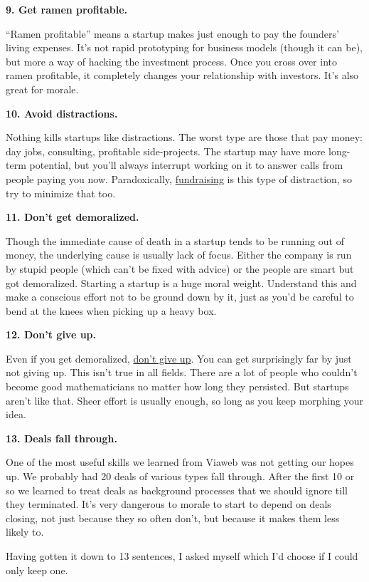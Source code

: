\documentclass[12pt]{book}
\begin{document}
\textbf{9. Get ramen profitable.}

``Ramen profitable'' means a startup makes just enough to pay the
founders' living expenses. It's not rapid prototyping for business
models (though it can be), but more a way of hacking the investment
process. Once you cross over into ramen profitable, it completely
changes your relationship with investors. It's also great for morale.

\textbf{10. Avoid distractions.}

Nothing kills startups like distractions. The worst type are those that
pay money: day jobs, consulting, profitable side-projects. The startup
may have more long-term potential, but you'll always interrupt working
on it to answer calls from people paying you now. Paradoxically,
\href{fundraising.html}{fundraising} is this type of distraction, so try
to minimize that too.

\textbf{11. Don't get demoralized.}

Though the immediate cause of death in a startup tends to be running out
of money, the underlying cause is usually lack of focus. Either the
company is run by stupid people (which can't be fixed with advice) or
the people are smart but got demoralized. Starting a startup is a huge
moral weight. Understand this and make a conscious effort not to be
ground down by it, just as you'd be careful to bend at the knees when
picking up a heavy box.

\textbf{12. Don't give up.}

Even if you get demoralized, \href{die.html}{don't give up}. You can get
surprisingly far by just not giving up. This isn't true in all fields.
There are a lot of people who couldn't become good mathematicians no
matter how long they persisted. But startups aren't like that. Sheer
effort is usually enough, so long as you keep morphing your idea.

\textbf{13. Deals fall through.}

One of the most useful skills we learned from Viaweb was not getting our
hopes up. We probably had 20 deals of various types fall through. After
the first 10 or so we learned to treat deals as background processes
that we should ignore till they terminated. It's very dangerous to
morale to start to depend on deals closing, not just because they so
often don't, but because it makes them less likely to.

Having gotten it down to 13 sentences, I asked myself which I'd choose
if I could only keep one.
\end{document}
